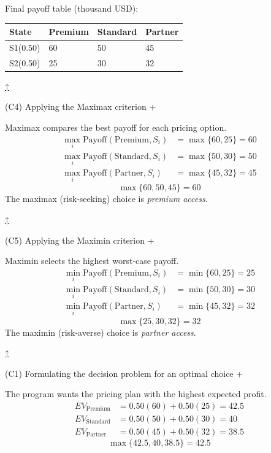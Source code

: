 \documentclass[11pt]{article}
\begin{document}
	
	Final payoff table (thousand USD):
	\begin{center}
		\begin{tabular}{llll}
			\toprule
			State & Premium & Standard & Partner \\
			\midrule
			S1\newline (0.50) & 60 & 50 & 45 \\
			S2\newline (0.50) & 25 & 30 & 32 \\
			\bottomrule
		\end{tabular}
	\end{center}
	
	
	
	
	\hyperref[problem3-criteria]{↑}
	
	
	
	
	(C4) Applying the Maximax criterion
	+
	
	
	Maximax compares the best payoff for each pricing option.
	\[
	\begin{aligned}
		\max_i \text{Payoff}(\text{Premium}, S_i) &= \max\{60, 25\} = 60 \\
		\max_i \text{Payoff}(\text{Standard}, S_i) &= \max\{50, 30\} = 50 \\
		\max_i \text{Payoff}(\text{Partner}, S_i) &= \max\{45, 32\} = 45
	\end{aligned}
	\]
	\[
	\max\{60, 50, 45\} = 60
	\]
	The maximax (risk-seeking) choice is \emph{premium access}.
	
	
	\hyperref[problem3-criteria]{↑}
	
	
	
	
	(C5) Applying the Maximin criterion
	+
	
	
	Maximin selects the highest worst-case payoff.
	\[
	\begin{aligned}
		\min_i \text{Payoff}(\text{Premium}, S_i) &= \min\{60, 25\} = 25 \\
		\min_i \text{Payoff}(\text{Standard}, S_i) &= \min\{50, 30\} = 30 \\
		\min_i \text{Payoff}(\text{Partner}, S_i) &= \min\{45, 32\} = 32
	\end{aligned}
	\]
	\[
	\max\{25, 30, 32\} = 32
	\]
	The maximin (risk-averse) choice is \emph{partner access}.
	
	
	\hyperref[problem3-criteria]{↑}
	
	
	
	
	(C1) Formulating the decision problem for an optimal choice
	+
	
	
	The program wants the pricing plan with the highest expected profit.
	\[
	\begin{aligned}
		EV_{\text{Premium}} &= 0.50(60) + 0.50(25) = 42.5 \\
		EV_{\text{Standard}} &= 0.50(50) + 0.50(30) = 40 \\
		EV_{\text{Partner}} &= 0.50(45) + 0.50(32) = 38.5
	\end{aligned}
	\]
	\[
	\max\{42.5, 40, 38.5\} = 42.5
	\]
	
\end{document}
